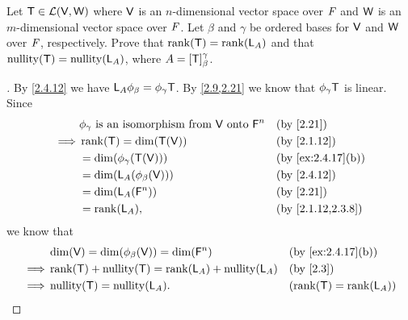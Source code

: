 \setcounter{ex}{19}
\begin{ex}\label{ex:2.4.20}
  Let \(\mathsf{T} \in \mathcal{L}(\mathsf{V}, \mathsf{W})\) where \(\mathsf{V}\) is an \(n\)-dimensional vector space over \(\mathit{F}\) and \(\mathsf{W}\) is an \(m\)-dimensional vector space over \(\mathit{F}\).
  Let \(\beta\) and \(\gamma\) be ordered bases for \(\mathsf{V}\) and \(\mathsf{W}\) over \(\mathit{F}\), respectively.
  Prove that \(\rk{\T} = \rk{\L_A}\) and that \(\nt{\T} = \nt{\L_A}\), where \(A = [\mathsf{T}]_{\beta}^{\gamma}\).
\end{ex}

\begin{proof}[]
  By \cref{2.4.12} we have \(\mathsf{L}_A \phi_{\beta} = \phi_{\gamma} \mathsf{T}\).
  By \cref{2.9,2.21} we know that \(\phi_{\gamma} \mathsf{T}\) is linear.
  Since
  \begin{align*}
             & \phi_{\gamma} \text{ is an isomorphism from } \V \text{ onto } \vs{F}^n &  & \text{(by \cref{2.21})}         \\
    \implies & \rk{\T} = \dim(\T(\V))                                                  &  & \text{(by \cref{2.1.12})}       \\
             & = \dim(\phi_{\gamma}(\T(\V)))                                           &  & \text{(by \cref{ex:2.4.17}(b))} \\
             & = \dim(\L_A(\phi_{\beta}(\V)))                                          &  & \text{(by \cref{2.4.12})}       \\
             & = \dim(\L_A(\vs{F}^n))                                                  &  & \text{(by \cref{2.21})}         \\
             & = \rk{\L_A},                                                            &  & \text{(by \cref{2.1.12,2.3.8})}
  \end{align*}
  we know that
  \begin{align*}
             & \dim(\V) = \dim(\phi_{\beta}(\V)) = \dim(\vs{F}^n) &  & \text{(by \cref{ex:2.4.17}(b))} \\
    \implies & \rk{\T} + \nt{\T} = \rk{\L_A} + \nt{\L_A}          &  & \text{(by \cref{2.3})}          \\
    \implies & \nt{\T} = \nt{\L_A}.                               &  & (\rk{\T} = \rk{\L_A})
  \end{align*}
\end{proof}

